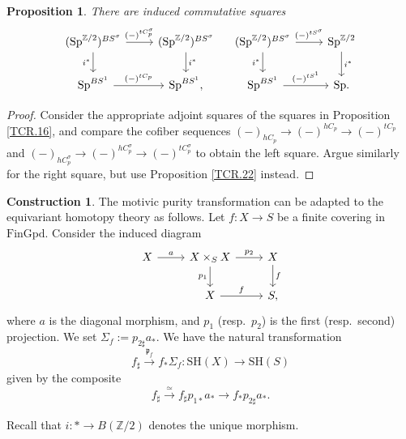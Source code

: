 \documentclass[10pt]{amsart}
\newtheorem{prop}[thm]{Proposition}
\theoremstyle{definition}
\newtheorem{const}[thm]{Construction}
\theoremstyle{remark}
\numberwithin{equation}{section}
\newcommand{\Z}{\mathbb{Z}}
\newcommand{\Sp}{\mathrm{Sp}}
\newcommand{\FinGpd}{\mathrm{FinGpd}}
\newcommand{\SH}{\mathrm{SH}}
\begin{document}
\begin{prop}
\label{TCR.28}
There are induced commutative squares
\[
\begin{tikzcd}
(\Sp^{\Z/2})^{BS^\sigma}\ar[r,"(-)^{tC_p^\sigma}"]\ar[d,"i^*"']&
(\Sp^{\Z/2})^{BS^\sigma}\ar[d,"i^*"]
\\
\Sp^{BS^1}\ar[r,"(-)^{tC_p}"]&
\Sp^{BS^1},
\end{tikzcd}
\quad
\begin{tikzcd}
(\Sp^{\Z/2})^{BS^\sigma}\ar[r,"(-)^{tS^\sigma}"]\ar[d,"i^*"']&
\Sp^{\Z/2}\ar[d,"i^*"]
\\
\Sp^{BS^1}\ar[r,"(-)^{tS^1}"]&
\Sp.
\end{tikzcd}
\]
\end{prop}
\begin{proof}
Consider the appropriate adjoint squares of the squares in Proposition \ref{TCR.16},
and compare the cofiber sequences $(-)_{hC_p}\to (-)^{hC_p}\to (-)^{tC_p}$ and $(-)_{hC_p^\sigma} \to (-)^{hC_p^\sigma} \to (-)^{tC_p^\sigma}$ to obtain the left square.
Argue similarly for the right square,
but use Proposition \ref{TCR.22} instead.
\end{proof}

\begin{const}
\label{TCR.17}
The motivic purity transformation \cite{Ayo07} can be adapted to the equivariant homotopy theory as follows.
Let $f\colon X\to S$ be a finite covering in $\FinGpd$.
Consider the induced diagram
\[
\begin{tikzcd}
X
\ar[r,"a"]&
X\times_S X\ar[d,"p_1"']\ar[r,"p_2"]&
X\ar[d,"f"]
\\
&
X\ar[r,"f"]&
S,
\end{tikzcd}
\]
where $a$ is the diagonal morphism, and $p_1$ (resp.\ $p_2$) is the first (resp.\ second) projection.
We set $\Sigma_f:=p_{2\sharp}a_*$.
We have the natural transformation 
\[
f_\sharp \xrightarrow{\mathfrak{p}_f} f_* \Sigma_f \colon \SH(X)\to \SH(S)
\]
given by the composite
\[
f_\sharp \xrightarrow{\simeq} f_\sharp p_{1*}a_*\to f_*p_{2\sharp }a_*.
\]
\end{const}

Recall that $i\colon *\to B(\Z/2)$ denotes the unique morphism.
\end{document}
